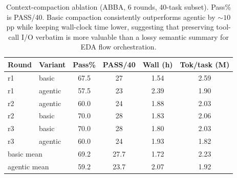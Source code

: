 \begin{table}[ht]
\centering
\small
\caption{Context-compaction ablation (ABBA, 6 rounds, 40-task subset). Pass\% is
PASS/40. Basic compaction consistently outperforms agentic by ${\sim}10$pp while
keeping wall-clock time lower, suggesting that preserving tool-call I/O verbatim
is more valuable than a lossy semantic summary for EDA flow orchestration.}
\label{tab:compaction-ablation}
\begin{tabular}{@{}llcccc@{}}
\toprule
\textbf{Round} & \textbf{Variant} & \textbf{Pass\%} & \textbf{PASS/40} & \textbf{Wall (h)} & \textbf{Tok/task (M)} \\
\midrule
r1 & basic   & 67.5 & 27 & 1.54 & 2.59 \\
r1 & agentic & 57.5 & 23 & 2.39 & 1.90 \\
r2 & agentic & 60.0 & 24 & 1.88 & 2.03 \\
r2 & basic   & 70.0 & 28 & 1.83 & 2.06 \\
r3 & basic   & 70.0 & 28 & 1.80 & 2.03 \\
r3 & agentic & 60.0 & 24 & 1.93 & 1.82 \\
\midrule
\multicolumn{2}{l}{basic mean}   & 69.2 & 27.7 & 1.72 & 2.23 \\
\multicolumn{2}{l}{agentic mean} & 59.2 & 23.7 & 2.07 & 1.92 \\
\bottomrule
\end{tabular}
\end{table}

